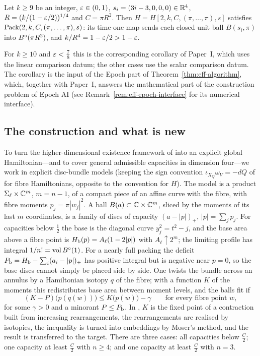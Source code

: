 \begin{maincorollary}\label{thm:main-epoch}
Let $k\ge9$ be an integer, $\varepsilon\in(0,1)$, $s_i=(3i-3,0,0,0)\in\mathbb{R}^4$, $R=(k/(1-\varepsilon/2))^{1/4}$ and $C=\pi R^2$. Then
$H=H[2,k,C,(\pi,\dots,\pi),s]$ satisfies $\mathrm{Pack}(2,k,C,(\pi,\dots,\pi),s)$: its time-one map sends each closed unit ball
$B(s_i,\pi)$ into $B^{\circ}(\pi R^2)$, and $k/R^4=1-\varepsilon/2>1-\varepsilon$.
\end{maincorollary}

For $k\ge10$ and $\varepsilon<\frac78$ this is the corresponding corollary of Paper~I, which uses the linear comparison datum;
the other cases use the scalar comparison datum. The corollary is the input of the Epoch part of
Theorem~\ref{thm:eff-algorithm}, which, together with Paper~I, answers the mathematical part of the construction problem
of Epoch AI \cite{Epoch} (see Remark~\ref{rem:eff-epoch-interface} for its numerical interface).

\subsection{The construction and what is new}\label{p2:sec-intro-mechanism}

To turn the higher-dimensional existence framework of \cite{OpenAI2026} into an explicit global Hamiltonian---and to
cover general admissible capacities in dimension four---we work in explicit disc-bundle models (keeping the sign
convention $\iota_{X_Q}\omega_V=-dQ$ of \cite{OpenAI2026} for fibre Hamiltonians, opposite to the convention for $H$).
The model is a product $\Sigma_\ell\times\mathbb{C}^m$, $m=n-1$, of a compact
piece of an affine curve with the fibre, with fibre moments $p_j=\pi|w_j|^2$. A ball $B(a)\subset\mathbb{C}\times\mathbb{C}^m$,
sliced by the moments of its last $m$ coordinates, is a family of discs of capacity $(a-|p|)_+$, $|p|=\sum_jp_j$. For
capacities below $\frac12$ the base is the diagonal curve $y_j^2=t^2-j$, and the base area above a fibre point is
$H_{\mathrm b}(p)=A_\ell(1-2|p|)$ with $A_\ell\uparrow2^m$; the limiting profile has integral $1/n!=\operatorname{vol}B^{\circ}(1)$. For a nearly
full packing the deficit $P_{\mathrm b}=H_{\mathrm b}-\sum_i(a_i-|p|)_+$ has positive integral but is negative near $p=0$, so the base
discs cannot simply be placed side by side. One twists the bundle across an annulus by a Hamiltonian isotopy $q$ of the
fibre; with a function $K$ of the moments this redistributes base area between moment levels, and the balls fit if
\[
 (K-P)\bigl(p(q(w))\bigr)\le K\bigl(p(w)\bigr)-\gamma\qquad\text{for every fibre point }w,
\]
for some $\gamma>0$ and a minorant $P\le P_{\mathrm b}$. In \cite{OpenAI2026}, $K$ is the fixed point of a contraction built
from increasing rearrangements, the rearrangements are realised by isotopies, the inequality is turned into
embeddings by Moser's method, and the result is transferred to the target. There are three cases: all capacities
below $\frac C2$; one capacity at least $\frac C2$ with $n\ge4$; and one capacity at least $\frac C2$ with $n=3$.

